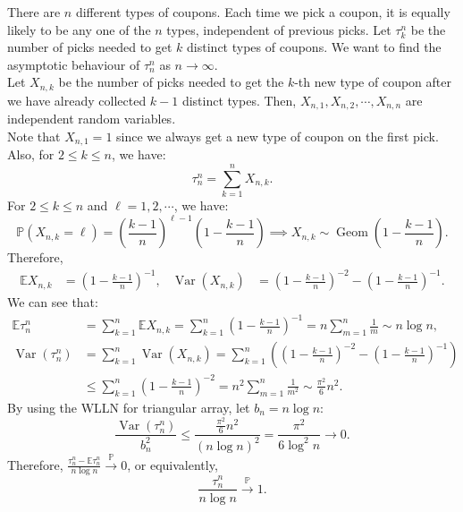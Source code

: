 \documentclass{huhtakm-template-book-v2}
\newcommand{\prob}{\mathbb{P}}
\newcommand{\expect}{\mathbb{E}}
\DeclareMathOperator{\Geom}{Geom}
\DeclareMathOperator{\Var}{Var}
\begin{document}
    \begin{eg} 
        There are $n$ different types of coupons. Each time we pick a coupon, it is equally likely to be any one of the $n$ types, independent of previous picks. Let $\tau_{k}^{n}$ be the number of picks needed to get $k$ distinct types of coupons. We want to find the asymptotic behaviour of $\tau_{n}^{n}$ as $n \to \infty$.\\
        Let $X_{n,k}$ be the number of picks needed to get the $k$-th new type of coupon after we have already collected $k-1$ distinct types. Then, $X_{n,1},X_{n,2},\cdots,X_{n,n}$ are independent random variables.\\
        Note that $X_{n,1} = 1$ since we always get a new type of coupon on the first pick. Also, for $2 \leq k \leq n$, we have:
        \begin{equation*}
            \tau_{n}^{n} = \sum_{k = 1}^{n}X_{n,k}.
        \end{equation*}
        For $2 \leq k \leq n$ and $\ell = 1,2,\cdots$, we have:
        \begin{equation*}
            \prob(X_{n,k} = \ell) = \left(\frac{k-1}{n}\right)^{\ell-1}\left(1-\frac{k-1}{n}\right) \implies X_{n,k} \sim \Geom\left(1-\frac{k-1}{n}\right).
        \end{equation*}
        Therefore,
        \begin{align*}
            \expect{X_{n,k}} &= \left(1-\frac{k-1}{n}\right)^{-1}, & \Var(X_{n,k}) &= \left(1-\frac{k-1}{n}\right)^{-2}-\left(1-\frac{k-1}{n}\right)^{-1}.
        \end{align*}
        We can see that:
        \begin{align*}
            \expect{\tau_{n}^{n}} &= \sum_{k = 1}^{n}\expect{X_{n,k}} = \sum_{k = 1}^{n}\left(1-\frac{k-1}{n}\right)^{-1} = n\sum_{m = 1}^{n}\frac{1}{m} \sim n\log n,\\
            \Var(\tau_{n}^{n}) &= \sum_{k = 1}^{n}\Var(X_{n,k}) = \sum_{k = 1}^{n}\left(\left(1-\frac{k-1}{n}\right)^{-2}-\left(1-\frac{k-1}{n}\right)^{-1}\right)\\
            &\leq \sum_{k = 1}^{n}\left(1-\frac{k-1}{n}\right)^{-2} = n^{2}\sum_{m = 1}^{n}\frac{1}{m^{2}} \sim \frac{\pi^{2}}{6}n^{2}.
        \end{align*}
        By using the WLLN for triangular array, let $b_{n} = n\log n$:
        \begin{equation*}
            \frac{\Var(\tau_{n}^{n})}{b_{n}^{2}} \leq \frac{\frac{\pi^{2}}{6}n^{2}}{(n\log n)^{2}} = \frac{\pi^{2}}{6\log^{2} n} \to 0.
        \end{equation*}
        Therefore, $\frac{\tau_{n}^{n}-\expect{\tau_{n}^{n}}}{n\log n} \xrightarrow{\prob} 0$, or equivalently,
        \begin{equation*}
            \frac{\tau_{n}^{n}}{n\log n} \xrightarrow{\prob} 1.
        \end{equation*}
    \end{eg}
    \newpage
\end{document}
